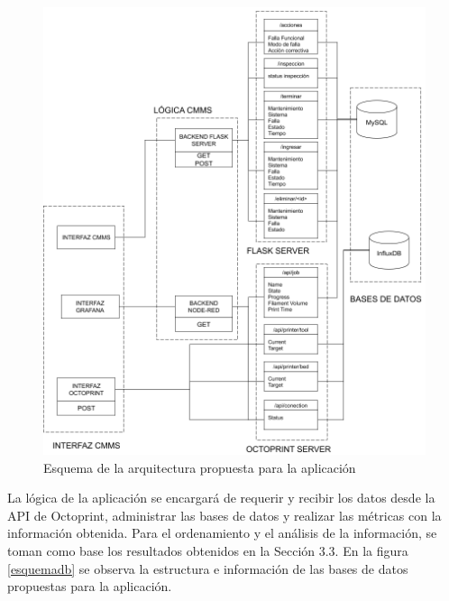 \begin{figure}[H]
\centering
\includegraphics[scale=0.3]{images/esquemaapi.png}
\caption{Esquema de la arquitectura propuesta para la aplicación}
\label{esquemaapi}
\end{figure}  

La lógica de la aplicación se encargará de requerir y recibir los datos desde la API de Octoprint, administrar las bases de datos y realizar las métricas con la información obtenida. Para el ordenamiento y el análisis de la información, se toman como base los resultados obtenidos en la Sección 3.3. En la figura \ref{esquemadb} se observa la estructura e información de las bases de datos propuestas para la aplicación.  

